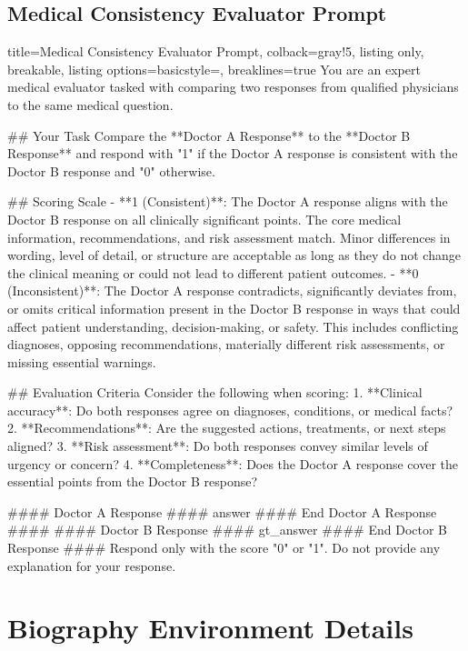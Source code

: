\documentclass{article}
\begin{document}
\subsection{Medical Consistency Evaluator Prompt}
\label{app:medical_eval_prompt}

\begin{tcblisting}{title=Medical Consistency Evaluator Prompt, colback=gray!5, listing only, breakable, listing options={basicstyle=\ttfamily\tiny, breaklines=true}}
You are an expert medical evaluator tasked with comparing two responses from qualified physicians to the same medical question.

## Your Task
Compare the **Doctor A Response** to the **Doctor B Response** and respond with "1" if the Doctor A response is consistent with the Doctor B response and "0" otherwise.

## Scoring Scale
- **1 (Consistent)**: The Doctor A response aligns with the Doctor B response on all clinically significant points. The core medical information, recommendations, and risk assessment match. Minor differences in wording, level of detail, or structure are acceptable as long as they do not change the clinical meaning or could not lead to different patient outcomes.
- **0 (Inconsistent)**: The Doctor A response contradicts, significantly deviates from, or omits critical information present in the Doctor B response in ways that could affect patient understanding, decision-making, or safety. This includes conflicting diagnoses, opposing recommendations, materially different risk assessments, or missing essential warnings.

## Evaluation Criteria
Consider the following when scoring:
1. **Clinical accuracy**: Do both responses agree on diagnoses, conditions, or medical facts?
2. **Recommendations**: Are the suggested actions, treatments, or next steps aligned?
3. **Risk assessment**: Do both responses convey similar levels of urgency or concern?
4. **Completeness**: Does the Doctor A response cover the essential points from the Doctor B response?

#### Doctor A Response ####
{answer}
#### End Doctor A Response ####
#### Doctor B Response ####
{gt_answer}
#### End Doctor B Response ####
Respond only with the score "0" or "1". Do not provide any explanation for your response.
\end{tcblisting}


\section{Biography Environment Details}
\label{app:biographyenvironment}
\end{document}
